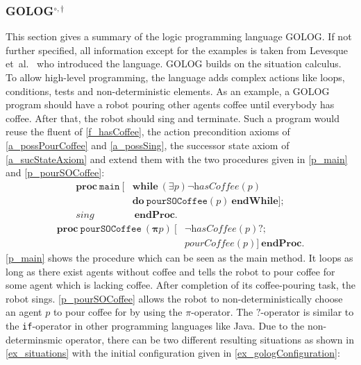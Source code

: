 \subsubsection[GOLOG]{GOLOG$^{\circ,\dagger}$}\label{fun:apl_golog}
This section gives a summary of the logic programming language GOLOG.
If not further specified, all information except for the examples is taken from Levesque et~al.~\cite{levesque_golog:_1997} who introduced the language.
GOLOG builds on the situation calculus.
To allow high-level programming, the language adds complex actions like loops, conditions, tests and non-deterministic elements.
As an example, a GOLOG program should have a robot pouring other agents coffee until everybody has coffee.
After that, the robot should sing and terminate.
Such a program would reuse the fluent of \autoref{f_hasCoffee}, the action precondition axioms of \autoref{a_possPourCoffee} and \ref{a_possSing}, the successor state axiom of \autoref{a_sucStateAxiom} and extend them with the two procedures given in \autoref{p_main} and \ref{p_pourSOCoffee}:
\begin{equation}\label{p_main}
  \begin{split}
    \textbf{proc}\ \texttt{main}\ [&\textbf{while}\ (\exists p) \neg\textit{hasCoffee}(p) \\
    &\textbf{do}\ \texttt{pourSOCoffee}(p)\ \textbf{endWhile}]; \\
    \textit{sing}&\ \textbf{endProc}.
  \end{split}
\end{equation}
\begin{equation}\label{p_pourSOCoffee}
  \begin{split}
    \textbf{proc}\ \texttt{pourSOCoffee}\ (\boldsymbol{\pi} p)\ [ &\neg\textit{hasCoffee}(p)\textbf{?}; \\
    &\textit{pourCoffee}(p)]\ \textbf{endProc}.
  \end{split}
\end{equation}
\autoref{p_main} shows the procedure which can be seen as the main method.
It loops as long as there exist agents without coffee and tells the robot to pour coffee for some agent which is lacking coffee.
After completion of its coffee-pouring task, the robot sings.
\autoref{p_pourSOCoffee} allows the robot to non-deterministically choose an agent $p$ to pour coffee for by using the $\pi$-operator.
The $?$-operator is similar to the \texttt{if}-operator in other programming languages like Java.
Due to the non-determinsmic operator, there can be two different resulting situations as shown in \autoref{ex_situations} with the initial configuration given in \autoref{ex_gologConfiguration}:
